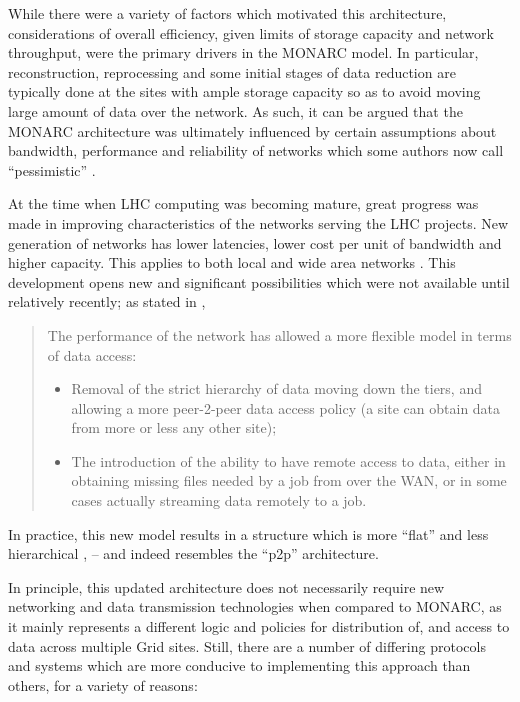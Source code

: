 While there were a variety of factors which motivated this architecture, considerations of overall efficiency, given
limits of storage capacity and network throughput, were the primary drivers in the MONARC model. In particular,
reconstruction, reprocessing and some initial stages of data reduction are typically done at the sites with
ample  storage capacity so as to avoid moving large amount of data over the network. As such, it can be argued 
that the MONARC architecture was ultimately influenced by certain assumptions about bandwidth, performance 
and reliability of networks which some authors now call ``pessimistic'' \cite [p.~105]{lhc_model_update}.

At the time when LHC computing was becoming mature, great progress was made in improving
characteristics of the networks serving the LHC projects. New generation of networks has lower
latencies, lower cost per unit of bandwidth and higher capacity. This applies to both local and wide 
area networks  \cite[p.104]{lhc_model_update}. This development opens new and significant possibilities 
which were not available until relatively recently; as stated in \cite{lhc_model_update},

\begin{quote}
The performance of the network has allowed a more flexible model in terms of data access:
	
	\begin{itemize}
		\item Removal of the strict hierarchy of data moving down the tiers, and allowing a
		more peer-2-peer data access policy (a site can obtain data from more or less any 
		other site);
		
		\item The introduction of the ability to have remote access to data, either in obtaining
		missing files needed by a job from over the WAN, or in some cases actually
		streaming data remotely to a job.
		
	\end{itemize}
\end{quote}

In practice, this new model results in a structure which is more ``flat'' and less hierarchical \cite{lhc_model_update}, \cite{courier_update} -- and indeed
resembles the ``p2p'' architecture.

In principle, this updated architecture does not necessarily require new networking and data transmission 
technologies when compared to MONARC, as it mainly represents a different logic and policies for 
distribution of, and access to data across multiple Grid sites. Still, there are a number of differing 
protocols and systems which are more conducive to implementing this approach than others, for a variety of reasons:

